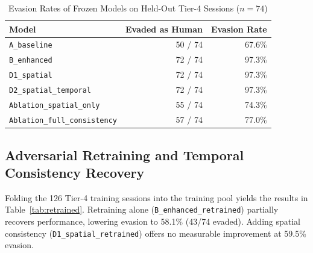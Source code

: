 \documentclass[conference]{IEEEtran}
\begin{document}
\begin{table}[t]
\caption{Evasion Rates of Frozen Models on Held-Out Tier-4 Sessions ($n=74$)}
\label{tab:frozen_evasion}
\centering
\begin{tabular}{lrr}
\toprule
\textbf{Model} & \textbf{Evaded as Human} & \textbf{Evasion Rate} \\
\midrule
\texttt{A\_baseline} & 50 / 74 & 67.6\% \\
\texttt{B\_enhanced} & 72 / 74 & 97.3\% \\
\texttt{D1\_spatial} & 72 / 74 & 97.3\% \\
\texttt{D2\_spatial\_temporal} & 72 / 74 & 97.3\% \\
\texttt{Ablation\_spatial\_only} & 55 / 74 & 74.3\% \\
\texttt{Ablation\_full\_consistency} & 57 / 74 & 77.0\% \\
\bottomrule
\end{tabular}
\end{table}

\subsection{Adversarial Retraining and Temporal Consistency Recovery}
Folding the 126 Tier-4 training sessions into the training pool yields the results in Table~\ref{tab:retrained}. Retraining alone (\texttt{B\_enhanced\_retrained}) partially recovers performance, lowering evasion to 58.1\% (43/74 evaded). Adding spatial consistency (\texttt{D1\_spatial\_retrained}) offers no measurable improvement at 59.5\% evasion.

\begin{table}[t]
\caption{Performance of Retrained Models with Tier-4 Folded In ($n=74$ Test)}
\label{tab:retrained}
\centering
{}
\end{table}
\end{document}
